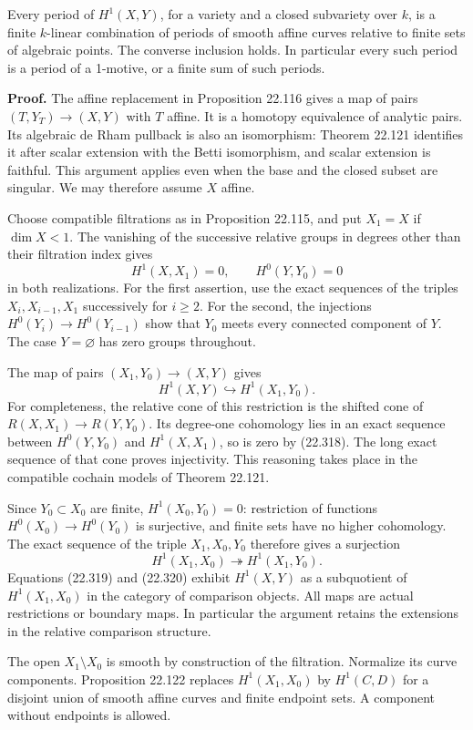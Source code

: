 \documentclass[
  11pt,
  a4paper,
]{article}
\begin{document}
Every period of \(H^1(X,Y)\), for a variety and a closed subvariety over
\(k\), is a finite \(k\)-linear combination of periods of smooth affine
curves relative to finite sets of algebraic points. The converse
inclusion holds. In particular every such period is a period of a
1-motive, or a finite sum of such periods.

\textbf{Proof.} The affine replacement in Proposition 22.116 gives a map
of pairs \((T,Y_T)\to(X,Y)\) with \(T\) affine. It is a homotopy
equivalence of analytic pairs. Its algebraic de Rham pullback is also an
isomorphism: Theorem 22.121 identifies it after scalar extension with
the Betti isomorphism, and scalar extension is faithful. This argument
applies even when the base and the closed subset are singular. We may
therefore assume \(X\) affine.

Choose compatible filtrations as in Proposition 22.115, and put
\(X_1=X\) if \(\dim X<1\). The vanishing of the successive relative
groups in degrees other than their filtration index gives \[
 H^1(X,X_1)=0,\qquad H^0(Y,Y_0)=0
 \tag{22.318}
\] in both realizations. For the first assertion, use the exact
sequences of the triples \(X_i,X_{i-1},X_1\) successively for \(i\ge2\).
For the second, the injections \(H^0(Y_i)\to H^0(Y_{i-1})\) show that
\(Y_0\) meets every connected component of \(Y\). The case
\(Y=\varnothing\) has zero groups throughout.

The map of pairs \((X_1,Y_0)\to(X,Y)\) gives \[
 H^1(X,Y)\hookrightarrow H^1(X_1,Y_0).
 \tag{22.319}
\] For completeness, the relative cone of this restriction is the
shifted cone of \(R(X,X_1)\to R(Y,Y_0)\). Its degree-one cohomology lies
in an exact sequence between \(H^0(Y,Y_0)\) and \(H^1(X,X_1)\), so is
zero by (22.318). The long exact sequence of that cone proves
injectivity. This reasoning takes place in the compatible cochain models
of Theorem 22.121.

Since \(Y_0\subset X_0\) are finite, \(H^1(X_0,Y_0)=0\): restriction of
functions \(H^0(X_0)\to H^0(Y_0)\) is surjective, and finite sets have
no higher cohomology. The exact sequence of the triple \(X_1,X_0,Y_0\)
therefore gives a surjection \[
 H^1(X_1,X_0)\twoheadrightarrow H^1(X_1,Y_0).
 \tag{22.320}
\] Equations (22.319) and (22.320) exhibit \(H^1(X,Y)\) as a subquotient
of \(H^1(X_1,X_0)\) in the category of comparison objects. All maps are
actual restrictions or boundary maps. In particular the argument retains
the extensions in the relative comparison structure.

The open \(X_1\setminus X_0\) is smooth by construction of the
filtration. Normalize its curve components. Proposition 22.122 replaces
\(H^1(X_1,X_0)\) by \(H^1(C,D)\) for a disjoint union of smooth affine
curves and finite endpoint sets. A component without endpoints is
allowed.
\end{document}
